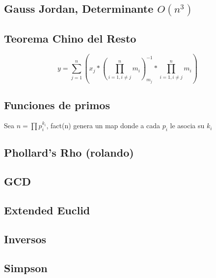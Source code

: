 \subsection{Gauss Jordan, Determinante $O(n^3)$}
\subsection{Teorema Chino del Resto}
$$y=\sum_{j=1}^n (x_j*(\prod_{i=1, i\neq j}^n m_i)_{m_j}^{-1}*\prod_{i=1, i\neq j}^n m_i)$$
\subsection{Funciones de primos}
Sea $n=\prod{p_i^{k_i}}$, fact(n) genera un map donde a cada $p_i$ le asocia su $k_i$
\subsection{Phollard's Rho (rolando)}
\subsection{GCD}
\subsection{Extended Euclid}
\subsection{Inversos}
\subsection{Simpson}
